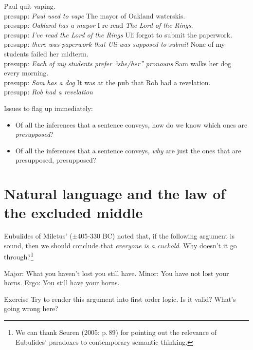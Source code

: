 \documentclass[cronos,landscape,paper=letter]{ling-handout}
\begin{document}
\pex\label{basics}
\a Paul quit vaping.\\
presupp: \textit{Paul used to vape}
\a The mayor of Oakland waterskis.\\
presupp: \textit{Oakland has a mayor}
\a I re-read \textit{The Lord of the Rings}.\\
presupp: \textit{I've read the Lord of the Rings}
\a Uli forgot to submit the paperwork.\\
presupp: \textit{there was paperwork that Uli was supposed to submit}
\a None of my students failed her midterm.\\
presupp: \textit{Each of my students prefer \enquote{she/her} pronouns}
\a Sam walks her dog every morning.\\
presupp: \textit{Sam has a dog}
\a It was at the pub that Rob had a revelation.\\
presupp: \textit{Rob had a revelation}
\xe

Issues to flag up immediately:

\begin{itemize}

  \item Of all the inferences that a sentence conveys, how do we know which ones are \textit{presupposed}?

  \item Of all the inferences that a sentence conveys, \textit{why} are just the ones that are presupposed, presupposed?

\end{itemize}

\section{Natural language and the law of the excluded middle}

Eubulides of Miletus' ($±$405-330 BC) noted that, if the following argument is sound, then we should conclude that \textit{everyone is a cuckold}. Why doesn't it go through?\footnote{We can thank Seuren (2005: p.\,89) for pointing out the relevance of Eubulides' paradoxes to contemporary semantic thinking.}

\pex
\a Major: What you haven't lost you still have.
\a\label{horns-minor}Minor: You have not lost your horns.
\a Ergo: You still have your horns.
\xe

\begin{tcolorbox}
  Exercise
  \tcblower
  Try to render this argument into first order logic. Is it valid? What's going wrong here?
\end{tcolorbox}
\end{document}
